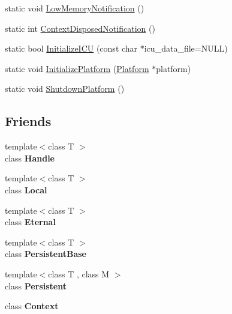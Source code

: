 \begin{DoxyCompactItemize}
\item 
static void \hyperlink{classv8_1_1_v8_a7df118b9667d04903f8e9fb7452fd1ac}{Low\+Memory\+Notification} ()
\item 
static int \hyperlink{classv8_1_1_v8_a06126bd2345c086a376f934ec1fbcce6}{Context\+Disposed\+Notification} ()
\item 
static bool \hyperlink{classv8_1_1_v8_a525b8e053a796b880fa809d0a4fc096a}{Initialize\+I\+C\+U} (const char $\ast$icu\+\_\+data\+\_\+file=N\+U\+L\+L)
\item 
static void \hyperlink{classv8_1_1_v8_a095eb8064458588a579c2b904e02dbbf}{Initialize\+Platform} (\hyperlink{classv8_1_1_platform}{Platform} $\ast$platform)
\item 
static void \hyperlink{classv8_1_1_v8_a228fad83cc2fe17f10cea1a6fb6669c7}{Shutdown\+Platform} ()
\end{DoxyCompactItemize}
\subsection*{Friends}
\begin{DoxyCompactItemize}
\item 
\hypertarget{classv8_1_1_v8_a67ca1a2d91273eaf85fb3d23ba8ce984}{}{\footnotesize template$<$class T $>$ }\\class {\bfseries Handle}\label{classv8_1_1_v8_a67ca1a2d91273eaf85fb3d23ba8ce984}

\item 
\hypertarget{classv8_1_1_v8_afb872edb4aac7ba55f0da004113aa2b0}{}{\footnotesize template$<$class T $>$ }\\class {\bfseries Local}\label{classv8_1_1_v8_afb872edb4aac7ba55f0da004113aa2b0}

\item 
\hypertarget{classv8_1_1_v8_adf5d8780aceb9310fb1246aae7ec348e}{}{\footnotesize template$<$class T $>$ }\\class {\bfseries Eternal}\label{classv8_1_1_v8_adf5d8780aceb9310fb1246aae7ec348e}

\item 
\hypertarget{classv8_1_1_v8_abb172e0bb22fc5fed7a3a66f29d046ce}{}{\footnotesize template$<$class T $>$ }\\class {\bfseries Persistent\+Base}\label{classv8_1_1_v8_abb172e0bb22fc5fed7a3a66f29d046ce}

\item 
\hypertarget{classv8_1_1_v8_ad845ec8872174be0a9ca9a3dd1898d30}{}{\footnotesize template$<$class T , class M $>$ }\\class {\bfseries Persistent}\label{classv8_1_1_v8_ad845ec8872174be0a9ca9a3dd1898d30}

\item 
\hypertarget{classv8_1_1_v8_ac26c806e60ca4a0547680edb68f6e39b}{}class {\bfseries Context}\label{classv8_1_1_v8_ac26c806e60ca4a0547680edb68f6e39b}

\end{DoxyCompactItemize}


